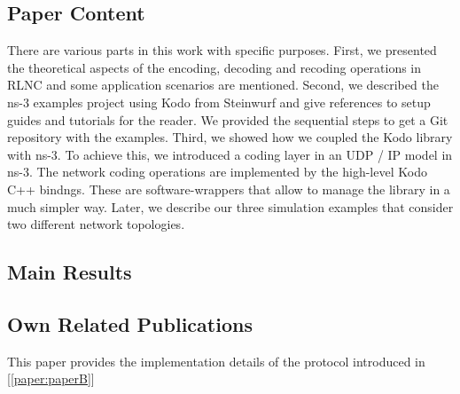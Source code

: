  \subsection*{Paper Content}
There are various parts in this work with specific purposes. First, we presented the theoretical aspects of the encoding, decoding and recoding operations in \ac{RLNC} and some application scenarios are mentioned. Second, we described the ns-3 examples project using Kodo from Steinwurf and give references to setup guides and tutorials for the reader. We provided the sequential steps to get a Git repository with the examples. Third, we showed how we coupled the Kodo library with ns-3. To achieve this, we introduced a coding layer in an \ac{UDP} / \ac{IP} model in ns-3. The network coding operations are implemented by the high-level Kodo C++ bindngs. These are software-wrappers that allow to manage the library in a much simpler way. Later, we describe our three simulation examples that consider two different network topologies.
\subsection*{Main Results}
\subsection*{Own Related Publications}
This paper provides the implementation details of the protocol introduced in [\ref{paper:paperB}]
\clearpage


